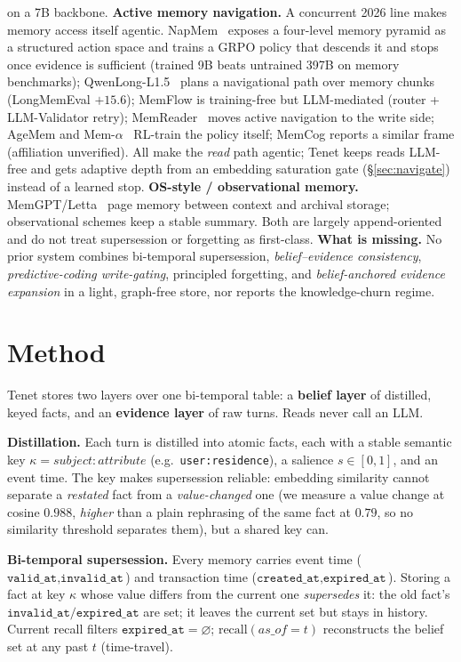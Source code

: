 \documentclass[11pt]{article}
\begin{document}
on a 7B backbone.
\textbf{Active memory navigation.} A concurrent 2026 line makes memory access itself
agentic. NapMem~\cite{napmem} exposes a four-level memory pyramid as a structured action
space and trains a GRPO policy that descends it and stops once evidence is sufficient
(trained 9B beats untrained 397B on memory benchmarks); QwenLong-L1.5~\cite{qwenlong}
plans a navigational path over memory chunks (LongMemEval $+15.6$); MemFlow
\cite{memflow} is training-free but LLM-mediated (router + LLM-Validator retry);
MemReader~\cite{memreader} moves active navigation to the write side; AgeMem
\cite{agemem} and Mem-$\alpha$~\cite{memalpha} RL-train the policy itself; MemCog
\cite{memcog} reports a similar frame (affiliation unverified). All make the \emph{read}
path agentic; Tenet keeps reads LLM-free and gets adaptive depth from an embedding
saturation gate (\S\ref{sec:navigate}) instead of a learned stop.
\textbf{OS-style / observational memory.} MemGPT/Letta~\cite{memgpt} page memory between
context and archival storage; observational schemes keep a stable summary. Both are largely
append-oriented and do not treat supersession or forgetting as first-class.
\textbf{What is missing.} No prior system combines bi-temporal supersession,
\emph{belief--evidence consistency}, \emph{predictive-coding write-gating}, principled
forgetting, and \emph{belief-anchored evidence expansion} in a light, graph-free
store, nor reports the knowledge-churn regime.

\section{Method}
Tenet stores two layers over one bi-temporal table: a \textbf{belief layer} of distilled,
keyed facts, and an \textbf{evidence layer} of raw turns. Reads never call an LLM.

\textbf{Distillation.} Each turn is distilled into atomic facts, each with a stable
semantic key $\kappa=\textit{subject}\!:\!\textit{attribute}$ (e.g.\ \texttt{user:residence}),
a salience $s\in[0,1]$, and an event time. The key makes supersession reliable: embedding
similarity cannot separate a \emph{restated} fact from a \emph{value-changed} one (we measure
a value change at cosine $0.988$, \emph{higher} than a plain rephrasing of the same fact at
$0.79$, so no similarity threshold separates them), but a shared key can.

\textbf{Bi-temporal supersession.} Every memory carries event time
($\texttt{valid\_at},\texttt{invalid\_at}$) and transaction time
($\texttt{created\_at},\texttt{expired\_at}$). Storing a fact at key $\kappa$ whose value
differs from the current one \emph{supersedes} it: the old fact's
$\texttt{invalid\_at}/\texttt{expired\_at}$ are set; it leaves the current set but stays in
history. Current recall filters $\texttt{expired\_at}=\varnothing$; $\text{recall}(as\_of{=}t)$
reconstructs the belief set at any past $t$ (time-travel).
\end{document}
